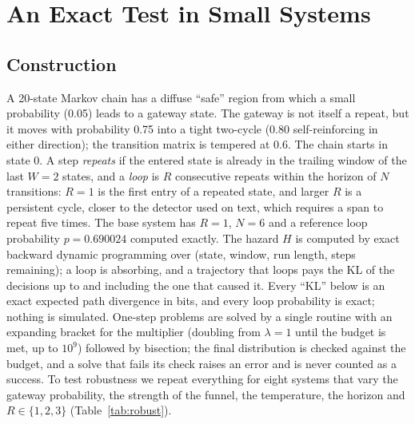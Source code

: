 \documentclass[make,article,submit,pdftex]{Definitions/mdpi}
\begin{document}
\section{An Exact Test in Small Systems}\label{sec:small}

\subsection{Construction}
A 20-state Markov chain has a diffuse ``safe'' region from which a small probability (0.05) leads to a gateway state. The gateway is not itself a repeat, but it moves with probability 0.75 into a tight two-cycle (0.80 self-reinforcing in either direction); the transition matrix is tempered at 0.6. The chain starts in state 0. A step \emph{repeats} if the entered state is already in the trailing window of the last $W=2$ states, and a \emph{loop} is $R$ consecutive repeats within the horizon of $N$ transitions: $R=1$ is the first entry of a repeated state, and larger $R$ is a persistent cycle, closer to the detector used on text, which requires a span to repeat five times. The base system has $R=1$, $N=6$ and a reference loop probability $p=0.690024$ computed exactly. The hazard $H$ is computed by exact backward dynamic programming over (state, window, run length, steps remaining); a loop is absorbing, and a trajectory that loops pays the KL of the decisions up to and including the one that caused it. Every ``KL'' below is an exact expected path divergence in bits, and every loop probability is exact; nothing is simulated. One-step problems are solved by a single routine with an expanding bracket for the multiplier (doubling from $\lambda=1$ until the budget is met, up to $10^9$) followed by bisection; the final distribution is checked against the budget, and a solve that fails its check raises an error and is never counted as a success. To test robustness we repeat everything for eight systems that vary the gateway probability, the strength of the funnel, the temperature, the horizon and $R\in\{1,2,3\}$ (Table~\ref{tab:robust}).
\end{document}
